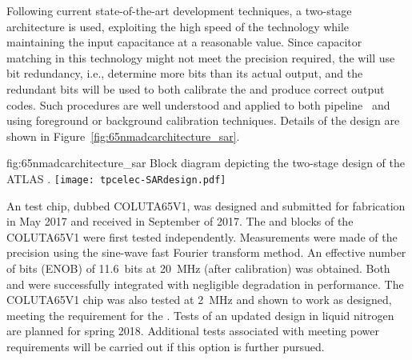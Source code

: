 Following current state-of-the-art  development techniques, a two-stage 
 architecture is used, exploiting the high speed of the technology while maintaining the  input 
capacitance at a reasonable value. Since capacitor matching in this technology might not meet the 
precision required, the  will use bit redundancy, i.e., determine more bits than its actual output, 
and the redundant bits will be used to both calibrate the  and produce correct output codes. 
Such procedures are well understood and applied to both pipeline~\cite{Kuppambatti:2013nfa} and 
~\cite{5999734}  using foreground or background calibration techniques. Details of the  design are shown in Figure~\ref{fig:65nmadcarchitecture_sar}. 

\begin{dunefigure}
{fig:65nmadcarchitecture_sar}
{Block diagram depicting the two-stage  design of the ATLAS  .}
\texttt{[image: tpcelec-SARdesign.pdf]}
\end{dunefigure}

An  test chip, dubbed COLUTA65V1, was designed and submitted for fabrication in May 2017 and received
in September of 2017.  The  and  blocks of the COLUTA65V1 were first tested independently. Measurements were made of the  precision using the sine-wave fast Fourier transform method. An effective number of bits
(ENOB) of \SI{11.6}{bits} at \SI{20}{MHz} (after calibration) was obtained.
Both  and  were successfully integrated with negligible degradation in performance. The COLUTA65V1 chip was also tested at \SI{2}{MHz} and shown to work as designed, meeting the requirement for the . %
Tests of an updated design in liquid nitrogen are planned for spring 2018. Additional tests associated with meeting power requirements will be carried out if this  option is further pursued.
